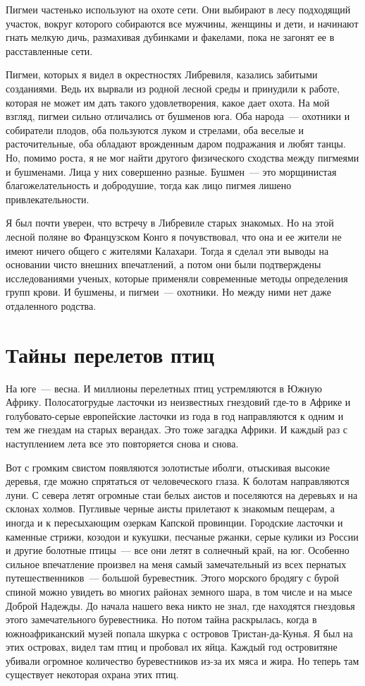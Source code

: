 \documentclass[12pt,a4paper,twoside,openany,svgnames]{memoir}
\begin{document}
Пигмеи частенько используют на охоте сети. Они выбирают в лесу подходящий участок, вокруг которого собираются все мужчины, женщины и дети, и начинают гнать мелкую дичь, размахивая дубинками и факелами, пока не загонят ее в расставленные сети.

Пигмеи, которых я видел в окрестностях Либревиля, казались забитыми созданиями. Ведь их вырвали из родной лесной среды и принудили к работе, которая не может им дать такого удовлетворения, какое дает охота. На мой взгляд, пигмеи сильно отличались от бушменов юга. Оба народа~--- охотники и собиратели плодов, оба пользуются луком и стрелами, оба веселые и расточительные, оба обладают врожденным даром подражания и любят танцы. Но, помимо роста, я не мог найти другого физического сходства между пигмеями и бушменами. Лица у них совершенно разные. Бушмен~--- это морщинистая благожелательность и добродушие, тогда как лицо пигмея лишено привлекательности.

Я был почти уверен, что встречу в Либревиле старых знакомых. Но на этой лесной поляне во Французском Конго я почувствовал, что она и ее жители не имеют ничего общего с жителями Калахари. Тогда я сделал эти выводы на основании чисто внешних впечатлений, а потом они были подтверждены исследованиями ученых, которые применяли современные методы определения групп крови. И бушмены, и пигмеи~--- охотники. Но между ними нет даже отдаленного родства.

\chapter{Тайны перелетов птиц}

На юге~--- весна. И миллионы перелетных птиц устремляются в Южную Африку. Полосатогрудые ласточки из неизвестных гнездовий где-то в Африке и голубовато-серые европейские ласточки из года в год направляются к одним и тем же гнездам на старых верандах. Это тоже загадка Африки. И каждый раз с наступлением лета все это повторяется снова и снова.

Вот с громким свистом появляются золотистые иболги, отыскивая высокие деревья, где можно спрятаться от человеческого глаза. К болотам направляются луни. С севера летят огромные стаи белых аистов и поселяются на деревьях и на склонах холмов. Пугливые черные аисты прилетают к знакомым пещерам, а иногда и к пересыхающим озеркам Капской провинции. Городские ласточки и каменные стрижи, козодои и кукушки, песчаные ржанки, серые кулики из России и другие болотные птицы~--- все они летят в солнечный край, на юг. Особенно сильное впечатление произвел на меня самый замечательный из всех пернатых путешественников~--- большой буревестник. Этого морского бродягу с бурой спиной можно увидеть во многих районах земного шара, в том числе и на мысе Доброй Надежды. До начала нашего века никто не знал, где находятся гнездовья этого замечательного буревестника. Но потом тайна раскрылась, когда в южноафриканский музей попала шкурка с островов Тристан-да-Кунья. Я был на этих островах, видел там птиц и пробовал их яйца. Каждый год островитяне убивали огромное количество буревестников из-за их мяса и жира. Но теперь там существует некоторая охрана этих птиц.
\end{document}
